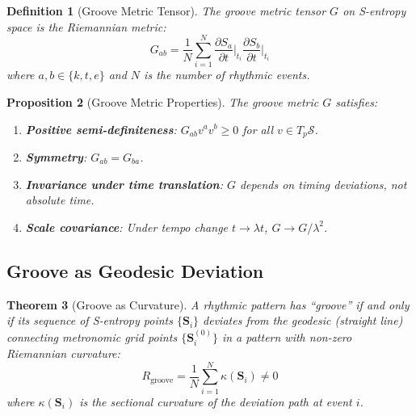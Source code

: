 \documentclass[twocolumn,10pt]{article}
\newtheorem{theorem}{Theorem}[section]
\newtheorem{proposition}[theorem]{Proposition}
\newtheorem{definition}[theorem]{Definition}
\theoremstyle{remark}
\newcommand{\calS}{\mathcal{S}}
\begin{document}
\begin{definition}[Groove Metric Tensor]
\label{def:groove_metric}
The groove metric tensor $G$ on S-entropy space is the Riemannian metric:
\begin{equation}
    G_{ab} = \frac{1}{N} \sum_{i=1}^{N} \frac{\partial S_a}{\partial t}\bigg|_{t_i} \frac{\partial S_b}{\partial t}\bigg|_{t_i}
    \label{eq:groove_metric}
\end{equation}
where $a, b \in \{k, t, e\}$ and $N$ is the number of rhythmic events.
\end{definition}

\begin{proposition}[Groove Metric Properties]
\label{prop:groove_properties}
The groove metric $G$ satisfies:
\begin{enumerate}
    \item \textbf{Positive semi-definiteness}: $G_{ab} v^a v^b \geq 0$ for all $v \in T_p\calS$.
    \item \textbf{Symmetry}: $G_{ab} = G_{ba}$.
    \item \textbf{Invariance under time translation}: $G$ depends on timing \textit{deviations}, not absolute time.
    \item \textbf{Scale covariance}: Under tempo change $t \to \lambda t$, $G \to G/\lambda^2$.
\end{enumerate}
\end{proposition}

\subsection{Groove as Geodesic Deviation}

\begin{theorem}[Groove as Curvature]
\label{thm:groove_curvature}
A rhythmic pattern has ``groove'' if and only if its sequence of S-entropy points $\{\mathbf{S}_i\}$ deviates from the geodesic (straight line) connecting metronomic grid points $\{\mathbf{S}_i^{(0)}\}$ in a pattern with non-zero Riemannian curvature:
\begin{equation}
    R_{\mathrm{groove}} = \frac{1}{N} \sum_{i=1}^{N} \kappa(\mathbf{S}_i) \neq 0
    \label{eq:groove_curvature}
\end{equation}
where $\kappa(\mathbf{S}_i)$ is the sectional curvature of the deviation path at event $i$.
\end{theorem}
\end{document}
